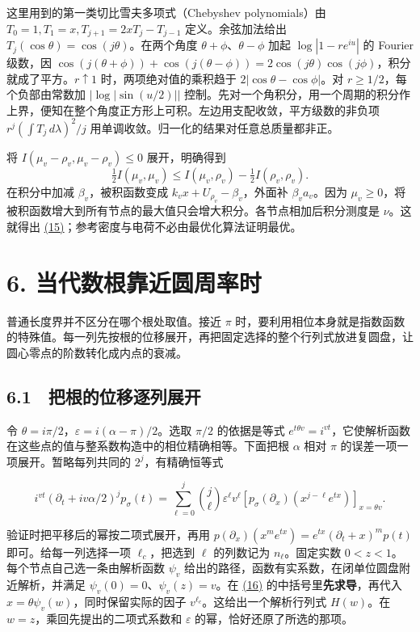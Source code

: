\documentclass[11pt,a4paper]{article}
\begin{document}
这里用到的第一类切比雪夫多项式（Chebyshev polynomials）由 \(T_0=1,T_1=x,T_{j+1}=2xT_j-T_{j-1}\) 定义。余弦加法给出 \(T_j(\cos\theta)=\cos(j\theta)\)。在两个角度 \(\theta+\phi\)、\(\theta-\phi\) 加起 \(\log|1-re^{iu}|\) 的 Fourier 级数，因 \(\cos(j(\theta+\phi))+\cos(j(\theta-\phi))=2\cos(j\theta)\cos(j\phi)\)，积分就成了平方。\(r\uparrow1\) 时，两项绝对值的乘积趋于 \(2|\cos\theta-\cos\phi|\)。对 \(r\ge1/2\)，每个负部由常数加 \(|\log|\sin(u/2)||\) 控制。先对一个角积分，用一个周期的积分作上界，便知在整个角度正方形上可积。左边用支配收敛，平方级数的非负项 \(r^j(\int T_j\,d\lambda)^2/j\) 用单调收敛。归一化的结果对任意总质量都非正。

将 \(I(\mu_v-\rho_v,\mu_v-\rho_v)\le0\) 展开，明确得到 \[
 \tfrac12 I(\mu_v,\mu_v)\le I(\mu_v,\rho_v)-\tfrac12 I(\rho_v,\rho_v).
\] 在积分中加减 \(\beta_v\)，被积函数变成 \(k_vx+U_{\rho_v}-\beta_v\)，外面补 \(\beta_va_v\)。因为 \(\mu_v\ge0\)，将被积函数增大到所有节点的最大值只会增大积分。各节点相加后积分测度是 \(\nu\)。这就得出 \hyperref[eq:15]{(15)}；参考密度与电荷不必由最优化算法证明最优。

\section{6. 当代数根靠近圆周率时}\label{ux5f53ux4ee3ux6570ux6839ux9760ux8fd1ux5706ux5468ux7387ux65f6}

普通长度界并不区分在哪个根处取值。接近 \(\pi\) 时，要利用相位本身就是指数函数的特殊值。每一列先按根的位移展开，再把固定选择的整个行列式放进复圆盘，让圆心零点的阶数转化成内点的衰减。

\subsection{6.1　把根的位移逐列展开}\label{ux628aux6839ux7684ux4f4dux79fbux9010ux5217ux5c55ux5f00}

令 \(\theta=i\pi/2\)，\(\varepsilon=i(\alpha-\pi)/2\)。选取 \(\pi/2\) 的依据是等式 \(e^{t\theta v}=i^{vt}\)，它使解析函数在这些点的值与整系数构造中的相位精确相等。下面把根 \(\alpha\) 相对 \(\pi\) 的误差一项一项展开。暂略每列共同的 \(2^j\)，有精确恒等式

\[
 i^{vt}(\partial_t+iv\alpha/2)^jp_\sigma(t)
 =\sum_{\ell=0}^j\binom j\ell\varepsilon^\ell v^\ell
      [p_\sigma(\partial_x)(x^{j-\ell}e^{tx})]_{x=\theta v}.              \tag{16}\label{eq:16}
\]

验证时把平移后的幂按二项式展开，再用 \(p(\partial_x)(x^m e^{tx})=e^{tx}(\partial_t+x)^mp(t)\) 即可。给每一列选择一项 \(\ell_c\)，把选到 \(\ell\) 的列数记为 \(n_\ell\)。固定实数 \(0<z<1\)。每个节点自己选一条由解析函数 \(\psi_v\) 给出的路径，函数有实系数，在闭单位圆盘附近解析，并满足 \(\psi_v(0)=0\)、\(\psi_v(z)=v\)。在 \hyperref[eq:16]{(16)} 的中括号里\textbf{先求导}，再代入 \(x=\theta\psi_v(w)\)，同时保留实际的因子 \(v^{\ell_c}\)。这给出一个解析行列式 \(H(w)\)。在 \(w=z\)，乘回先提出的二项式系数和 \(\varepsilon\) 的幂，恰好还原了所选的那项。
\end{document}
